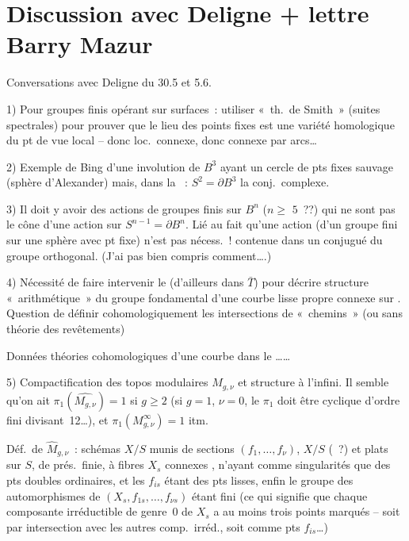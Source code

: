 \documentclass[11pt,a4paper]{article}
\begin{document}
\section{Discussion avec Deligne + lettre Barry Mazur}

Conversations avec Deligne du 30.5 et 5.6.

1) Pour groupes finis opérant sur surfaces~: utiliser «~th.\ de Smith~»
(suites spectrales) pour prouver que le lieu des points fixes est une
variété homologique du pt de vue local -- donc \ill{} loc.\ connexe,
donc connexe par arcs…

2) Exemple de Bing d'une involution de $B^3$ ayant un cercle de pts fixes
sauvage (sphère   d'Alexander)
mais, dans la \ill{}~: $S^2=\partial B^3$ \ill{} la conj.\ complexe.

3) Il doit y avoir des actions  de groupes finis sur
$B^n$ ($n\geq{}$\struck{\ill{}} $5$~??) qui ne sont pas le cône d'une
action sur $S^{n-1}=\partial B^n$. Lié au fait qu'une
\struck{\ill{}} action (d'un groupe fini sur une sphère avec pt fixe)
\struck{\ill{}} n'est pas nécess.~! contenue dans un conjugué
 du groupe orthogonal. (J'ai pas bien compris
comment….)

4) Nécessité de faire intervenir le 
(d'ailleurs dans $\bar{T}$) pour décrire  
structure «~arithmétique~» du groupe fondamental d'une courbe lisse
propre connexe sur . Question de définir
cohomologiquement les intersections de «~chemins~» (ou sans théorie des
revêtements)


Données théories cohomologiques d'une courbe dans le \ill{} ……


5) Compactification des topos modulaires $M_{g,\nu}$ et structure à
l'infini. Il semble qu'on ait $\pi_1(\widehat{M_{g,\nu}})=1$ si $g\geq 2$
(si $g=1$, $\nu=0$, le $\pi_1$ doit être cyclique 
d'ordre fini divisant~12…), et $\pi_1(M^{\infty}_{g,\nu})=1$ itm.

\marginal{*} Déf.\ de $\widehat{M}_{g,\nu}$~: schémas $X/S$ munis de
sections $(f_1,\dots,f_\nu)$, $X/S$ 
(~?) et plats sur $S$, de prés.\ finie, à fibres
$X_s$  connexes , n'ayant comme
singularités que des pts doubles ordinaires, et les $f_{is}$ étant des
pts lisses, enfin le groupe des automorphismes de
$(X_s,f_{1s},\dots,f_{\nu s})$ étant fini (ce qui signifie que
 chaque composante irréductible de genre~0 de $X_s$ a au
moins trois points marqués -- soit par intersection avec les autres
comp.\ irréd., soit comme pts $f_{is}$…)
\end{document}
